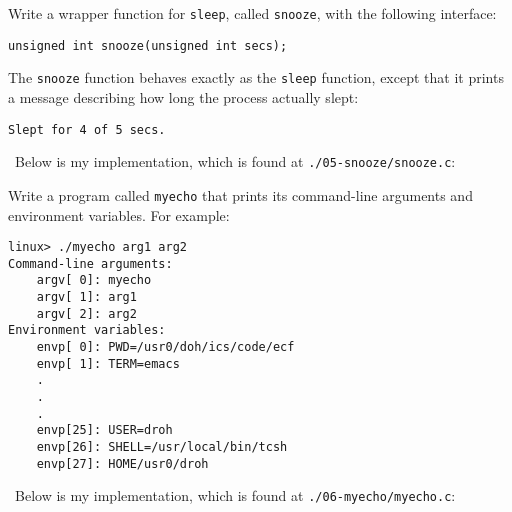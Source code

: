 \documentclass[12pt]{article}
\newenvironment{ex}[2][Exercise]{\begin{trivlist}
		\item[\hskip \labelsep {\bfseries #1}\hskip \labelsep {\bfseries #2.}]}{\end{trivlist}}
\newenvironment{sol}[1][Solution]{\begin{trivlist}
		\item[\hskip \labelsep {\bfseries #1:}]}{\end{trivlist}}
\begin{document}
\begin{ex}{8.5}
	Write a wrapper function for \texttt{sleep}, called \texttt{snooze}, with the following
	interface:
	\begin{lstlisting}
unsigned int snooze(unsigned int secs);
	\end{lstlisting}
	The \texttt{snooze} function behaves exactly as the \texttt{sleep} function, except that
	it prints a message describing how long the process actually slept:
	\begin{lstlisting}[language={}]
Slept for 4 of 5 secs.
	\end{lstlisting}
\end{ex}

\begin{sol}
	\
	Below is my implementation, which is found at \texttt{./05-snooze/snooze.c}:
	
\end{sol}

\begin{ex}{8.6}
	Write a program called \texttt{myecho} that prints its command-line arguments and environment
	variables. For example:
	\begin{lstlisting}[language={}]
linux> ./myecho arg1 arg2
Command-line arguments:
	argv[ 0]: myecho
	argv[ 1]: arg1
	argv[ 2]: arg2
Environment variables:
	envp[ 0]: PWD=/usr0/doh/ics/code/ecf
	envp[ 1]: TERM=emacs
	.
	.
	.
	envp[25]: USER=droh
	envp[26]: SHELL=/usr/local/bin/tcsh
	envp[27]: HOME/usr0/droh
	\end{lstlisting}
\end{ex}

\begin{sol}
	\
	Below is my implementation, which is found at \texttt{./06-myecho/myecho.c}:
	
\end{sol}
\end{document}
